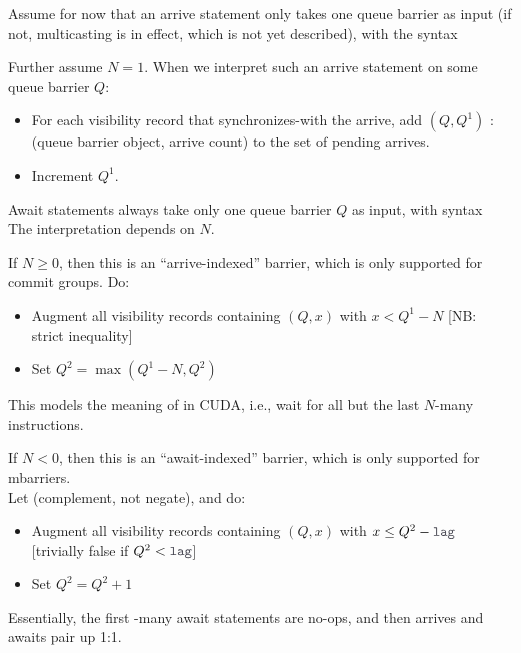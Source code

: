 \filbreak
{}

Assume for now that an arrive statement only takes one queue barrier as input (if not, multicasting is in effect, which is not yet described), with the syntax\\

\filbreak
Further assume $N = 1$.
When we interpret such an arrive statement on some queue barrier $Q$:
\begin{itemize}
  \item For each visibility record that synchronizes-with the arrive, add $(Q, Q^1)$ : (queue barrier object, arrive count) to the set of pending arrives.
  \item Increment $Q^1$.
\end{itemize}

\filbreak
{}

Await statements always take only one queue barrier $Q$ as input, with syntax\\
The interpretation depends on $N$.

\filbreak
If $N \geq 0$, then this is an ``arrive-indexed'' barrier, which is only supported for commit groups. Do:
\begin{itemize}
  \item Augment all visibility records containing $(Q, x)$ with $x < Q^1 - N$ [NB: strict inequality]
  \item Set $Q^2 = \max(Q^1 - N, Q^2)$
\end{itemize}
This models the meaning of  in CUDA, i.e., wait for all but the last $N$-many  instructions.

\filbreak
If $N < 0$, then this is an ``await-indexed'' barrier, which is only supported for mbarriers.\\
Let  (complement, not negate), and do:
\begin{itemize}
  \item Augment all visibility records containing $(Q, x)$ with $x \leq Q^2 - \lighttt{lag}$ [trivially false if $Q^2 < \lighttt{lag}$]
  \item Set $Q^2 = Q^2 + 1$
\end{itemize}
Essentially, the first -many await statements are no-ops, and then arrives and awaits pair up 1:1.


